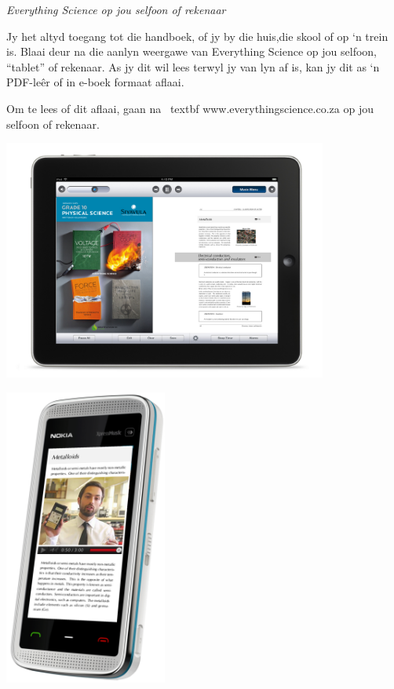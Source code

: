 \newpage
\thispagestyle{empty}

{\normalfont\sffamily\fontsize{22}\normalfont\itshape Everything Science op jou selfoon of rekenaar} \par

{\Large
Jy het altyd toegang  tot die handboek, of jy by die huis,die skool of op ‘n trein is. Blaai deur na die aanlyn weergawe van Everything Science op jou selfoon, “tablet” of rekenaar. As jy dit wil lees terwyl jy van lyn af is, kan jy dit as ‘n PDF-leêr of in e-boek formaat aflaai.\par


Om te lees of dit aflaai, gaan na \ textbf {www.everythingscience.co.za} op jou selfoon of rekenaar.} \vspace*{2cm}


\begin{center}
\begin{minipage}{0.4\textwidth}
\centering
\includegraphics[width=0.8\textwidth]{title_images/ipad.jpg}
\end{minipage}
\begin{minipage}{0.4\textwidth}
\centering
\includegraphics[width=0.4\textwidth]{title_images/phone.png}
\end{minipage}
\end{center}

